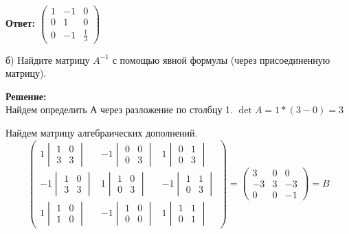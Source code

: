 \documentclass[a4paper,12pt]{article}
\begin{document}
\begin{enumerate}
\textbf{Ответ: 
$\begin{pmatrix}
1&-1&0\\
0&1&0\\
0&-1&\frac{1}{3}
\end{pmatrix}$}

б) Найдите матрицу $A^{-1}$ с помощью явной формулы (через присоединенную матрицу).

\textbf{Решение:}\\
Найдем определить А через разложение по столбцу 1.
$\det A = 1 *(3-0)=3$

Найдем матрицу алгебраических дополнений.
$$\begin{pmatrix}
1\begin{vmatrix}
1 & 0  \\ 
3 & 3 
\end{vmatrix}&-1\begin{vmatrix}
0 & 0  \\ 
0 & 3 
\end{vmatrix}&1\begin{vmatrix}
0 & 1  \\ 
0 & 3 
\end{vmatrix}\\
-1\begin{vmatrix}
1 & 0  \\ 
3 & 3 
\end{vmatrix}&1\begin{vmatrix}
1 & 0  \\ 
0 & 3 
\end{vmatrix}&-1\begin{vmatrix}
1 & 1  \\ 
0 & 3 
\end{vmatrix}\\
1\begin{vmatrix}
1 & 0  \\ 
1 & 0 
\end{vmatrix}&-1\begin{vmatrix}
1 & 0  \\ 
0 & 0 
\end{vmatrix}&1\begin{vmatrix}
1 & 1  \\ 
0 & 1 
\end{vmatrix}
\end{pmatrix}=\begin{pmatrix}
3&0&0\\
-3&3&-3\\
0&0&-1
\end{pmatrix}=B$$


\end{enumerate}
\end{document}
